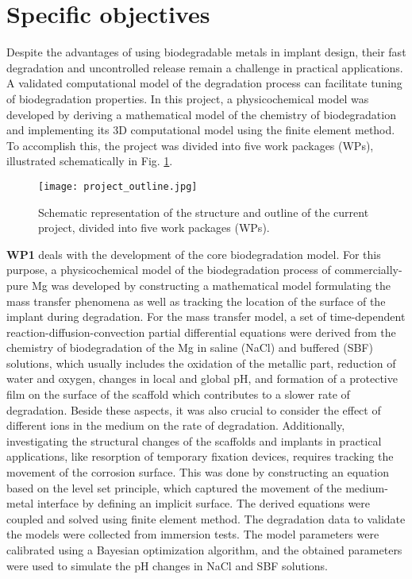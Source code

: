 \section{Specific objectives}

Despite the advantages of using biodegradable metals in implant design, their fast degradation and uncontrolled release remain a challenge in practical applications. A validated computational model of the degradation process can facilitate tuning of biodegradation properties. In this project, a physicochemical model was developed by deriving a mathematical model of the chemistry of biodegradation and implementing its 3D computational model using the finite element method. To accomplish this, the project was divided into five work packages (WPs), illustrated schematically in Fig. \ref{fig:objective_project_outline}.

\begin{figure}
\centering
\medskip
\texttt{[image: project\_outline.jpg]}
\caption[Schematic of the project outline]{Schematic representation of the structure and outline of the current project, divided into five work packages (WPs).} \label{fig:objective_project_outline}
\end{figure}

\textbf{WP1} deals with the development of the core biodegradation model. For this purpose, a physicochemical model of the biodegradation process of commercially-pure Mg was developed by constructing a mathematical model formulating the mass transfer phenomena as well as tracking the location of the surface of the implant during degradation. For the mass transfer model, a set of time-dependent reaction-diffusion-convection partial differential equations were derived from the chemistry of biodegradation of the Mg in saline (NaCl) and buffered (SBF) solutions, which usually includes the oxidation of the metallic part, reduction of water and oxygen, changes in local and global pH, and formation of a protective film on the surface of the scaffold which contributes to a slower rate of degradation. Beside these aspects, it was also crucial to consider the effect of different ions in the medium on the rate of degradation. Additionally, investigating the structural changes of the scaffolds and implants in practical applications, like resorption of temporary fixation devices, requires tracking the movement of the corrosion surface. This was done by constructing an equation based on the level set principle, which captured the movement of the medium-metal interface by defining an implicit surface. The derived equations were coupled and solved using finite element method. The degradation data to validate the models were collected from immersion tests. The model parameters were calibrated using a Bayesian optimization algorithm, and the obtained parameters were used to simulate the pH changes in NaCl and SBF solutions.

